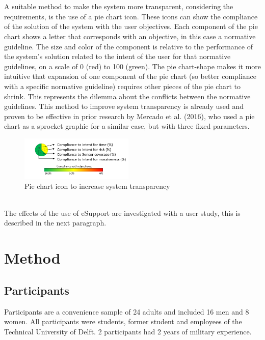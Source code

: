 \documentclass[twoside,twocolumn]{article}
\begin{document}
\\\\
A suitable method to make the system more transparent, considering the requirements, is the use of a pie chart icon. These icons can show the compliance of the solution of the system with the user objectives. Each component of the pie chart shows a letter that corresponds with an objective, in this case a normative guideline. The size and color of the component is relative to the performance of the system's solution related to the intent of the user for that normative guidelines, on a scale of 0 (red) to 100 (green). The pie chart-shape makes it more intuitive that expansion of one component of the pie chart (so better compliance with a specific normative guideline) requires other pieces of the pie chart to shrink. This represents the dilemma about the conflicts between the normative guidelines. This method to improve system transparency is already used and proven to be effective in prior research by Mercado et al. (2016), who used a pie chart as a sprocket graphic for a similar case, but with three fixed parameters.  
%
\begin{figure}[h]
	\centering
		\includegraphics[width=0.48\textwidth]{images/piechart.png}
	\caption{Pie chart icon to increase system transparency}
	\label{fig:piechart}
\end{figure}
\\
The effects of the use of eSupport are investigated with a user study, this is described in the next paragraph.

\section{Method}

\subsection{Participants}
Participants are a convenience sample of 24 adults and included 16 men and 8 women. All participants were students, former student and employees of the Technical University of Delft. 2 participants had 2 years of military experience. 
\end{document}
